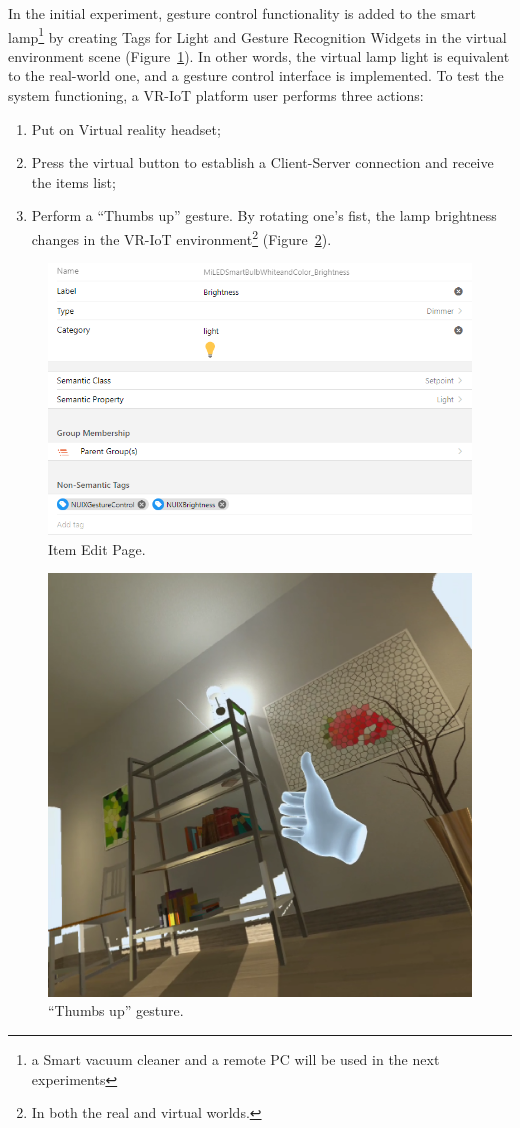 In the initial experiment, gesture control functionality is added to the smart lamp\footnote{a Smart vacuum cleaner and a remote PC will be used in the next experiments} by creating Tags for Light and Gesture Recognition Widgets in the virtual environment scene (Figure~\ref{fig:ItemEditPage-figure}). In other words, the virtual lamp light is equivalent to the real-world one, and a gesture control interface is implemented. To test the system functioning, a VR-IoT platform user performs three actions:

\begin{enumerate}
    \item Put on Virtual reality headset;
    \item Press the virtual button to establish a Client-Server connection and receive the items list;
    \item Perform a ``Thumbs up'' gesture. By rotating one's fist, the lamp brightness changes in the VR-IoT environment\footnote{In both the real and virtual worlds.} (Figure~\ref{fig:FullBrightnessOculus-figure}).
\end{enumerate}

\begin{figure}
  \centering
  \includegraphics[width = 0.9 \linewidth]{figures/ItemEditPage.png}
  \caption{Item Edit Page.}
  \label{fig:ItemEditPage-figure}
\end{figure}


\begin{figure}
  \centering
  \includegraphics[width = 0.6 \linewidth]{figures/FullBrightnessOculus.png}
  \caption{``Thumbs up'' gesture.}
  \label{fig:FullBrightnessOculus-figure}
\end{figure}

